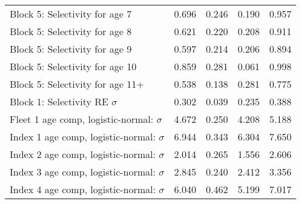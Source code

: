 \documentclass[
]{article}
\begin{document}
\begin{landscape}
\begin{longtable}[t]{lrrrr}
\addlinespace
Block 5: Selectivity for age 7 & 0.696 & 0.246 & 0.190 & 0.957\\
Block 5: Selectivity for age 8 & 0.621 & 0.220 & 0.208 & 0.911\\
Block 5: Selectivity for age 9 & 0.597 & 0.214 & 0.206 & 0.894\\
Block 5: Selectivity for age 10 & 0.859 & 0.281 & 0.061 & 0.998\\
Block 5: Selectivity for age 11+ & 0.538 & 0.138 & 0.281 & 0.775\\
\addlinespace
Block 1: Selectivity RE $\sigma$ & 0.302 & 0.039 & 0.235 & 0.388\\
Fleet 1 age comp, logistic-normal: $\sigma$ & 4.672 & 0.250 & 4.208 & 5.188\\
Index 1 age comp, logistic-normal: $\sigma$ & 6.944 & 0.343 & 6.304 & 7.650\\
Index 2 age comp, logistic-normal: $\sigma$ & 2.014 & 0.265 & 1.556 & 2.606\\
Index 3 age comp, logistic-normal: $\sigma$ & 2.845 & 0.240 & 2.412 & 3.356\\
\addlinespace
Index 4 age comp, logistic-normal: $\sigma$ & 6.040 & 0.462 & 5.199 & 7.017\\*
\end{longtable}
\end{landscape}
\end{document}
